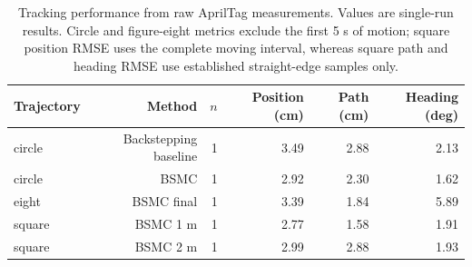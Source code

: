 \begin{table}[!t]
\centering
\caption{Tracking performance from raw AprilTag measurements. Values are single-run results. Circle and figure-eight metrics exclude the first 5 s of motion; square position RMSE uses the complete moving interval, whereas square path and heading RMSE use established straight-edge samples only.}
\label{tab:tracking}
\begin{tabular}{lrrrrr}
\hline
Trajectory & Method & $n$ & Position (cm) & Path (cm) & Heading (deg) \\
\hline
circle & Backstepping baseline & 1 & 3.49 & 2.88 & 2.13 \\
circle & BSMC & 1 & 2.92 & 2.30 & 1.62 \\
eight & BSMC final & 1 & 3.39 & 1.84 & 5.89 \\
square & BSMC 1 m & 1 & 2.77 & 1.58 & 1.91 \\
square & BSMC 2 m & 1 & 2.99 & 2.88 & 1.93 \\
\hline
\end{tabular}
\end{table}
